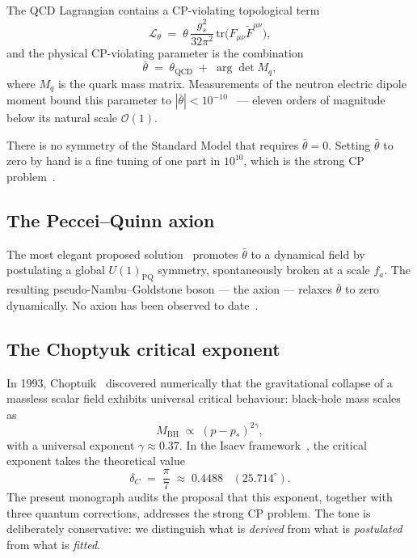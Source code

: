 \documentclass[11pt,a4paper]{article}
\newcommand{\dC}{\delta_C}
\providecommand{\tr}{}
\renewcommand{\tr}{\mathrm{tr}}
\theoremstyle{plain}
\theoremstyle{definition}
\theoremstyle{remark}
\begin{document}
The QCD Lagrangian contains a CP-violating topological term
\begin{equation}
\mathcal{L}_\theta
   \;=\; \theta\,\frac{g_s^2}{32\pi^2}\,
          \tr\bigl(F_{\mu\nu}\tilde F^{\mu\nu}\bigr),
\end{equation}
and the physical CP-violating parameter is the combination
\begin{equation}
\bar\theta \;=\; \theta_{\mathrm{QCD}} \;+\; \arg\det M_q,
\end{equation}
where $M_q$ is the quark mass matrix.  Measurements of the neutron
electric dipole moment bound this parameter to
$|\bar\theta| < 10^{-10}$~\cite{abel2020nEDM} --- eleven orders of
magnitude below its natural scale $\mathcal{O}(1)$.

There is no symmetry of the Standard Model that requires
$\bar\theta = 0$.  Setting $\bar\theta$ to zero by hand is a fine
tuning of one part in $10^{10}$, which is the strong CP
problem~\cite{tHooft1976,witten1998theta}.

\subsection{The Peccei--Quinn axion}

The most elegant proposed solution~\cite{pecceiquinn1977,weinberg1978,
wilczek1978} promotes $\bar\theta$ to a dynamical field by postulating
a global $U(1)_{\mathrm{PQ}}$ symmetry, spontaneously broken at a scale
$f_a$.  The resulting pseudo-Nambu--Goldstone boson --- the axion ---
relaxes $\bar\theta$ to zero dynamically.  No axion has been observed
to date~\cite{irastorza2018axion,adams2022axion}.

\subsection{The Choptyuk critical exponent}

In 1993, Choptuik~\cite{choptyuk1993} discovered numerically that the
gravitational collapse of a massless scalar field exhibits universal
critical behaviour: black-hole mass scales as
\begin{equation}
M_{\mathrm{BH}} \;\propto\; (p - p_*)^{2\gamma},
\end{equation}
with a universal exponent $\gamma \approx 0.37$.  In the Isaev
framework~\cite{isaev2024spinor}, the critical exponent takes the
theoretical value
\begin{equation}\label{eq:delta-C}
  \dC \;=\; \frac{\pi}{7} \;\approx\; 0.4488 \;\;\;(25.714^\circ).
\end{equation}
The present monograph audits the proposal that this exponent, together
with three quantum corrections, addresses the strong CP problem.  The
tone is deliberately conservative: we distinguish what is \emph{derived}
from what is \emph{postulated} from what is \emph{fitted}.
\end{document}
